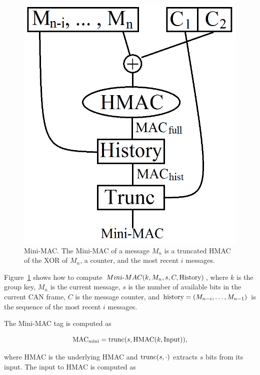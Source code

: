	\begin{figure}
		\centering
		\includegraphics[width=\columnwidth]{figures/minimac_diagram.png}
		\caption{Mini-MAC. The Mini-MAC of a message $M_n$ is a truncated HMAC of 
		the XOR of $M_n$, a counter, and the most recent $i$ messages.}
		\label{fig-minimac}
	\end{figure}

Figure~\ref{fig-minimac} shows how to compute 
$Mini\hbox{-}MAC(k,M_n,s,C,\hbox{History})$, 
where $k$ is the group key, 
$M_n$ is the current message, 
$s$ is the number of available bits in the current CAN frame, 
$C$ is the message counter, 
and $\hbox{history} = (M_{n-i}, \ldots, M_{n-1})$ is the sequence of the most recent
$i$ messages.

The Mini-MAC tag is computed as

\begin{equation}
\text{MAC}_{\text{mini}} = \hbox{trunc(}s,\text{HMAC}(k,\text{Input})),
\end{equation}

\noindent where HMAC is the underlying HMAC and $\hbox{trunc}(s,\cdot)$
extracts $s$ bits from its input.  The input to HMAC is computed as

